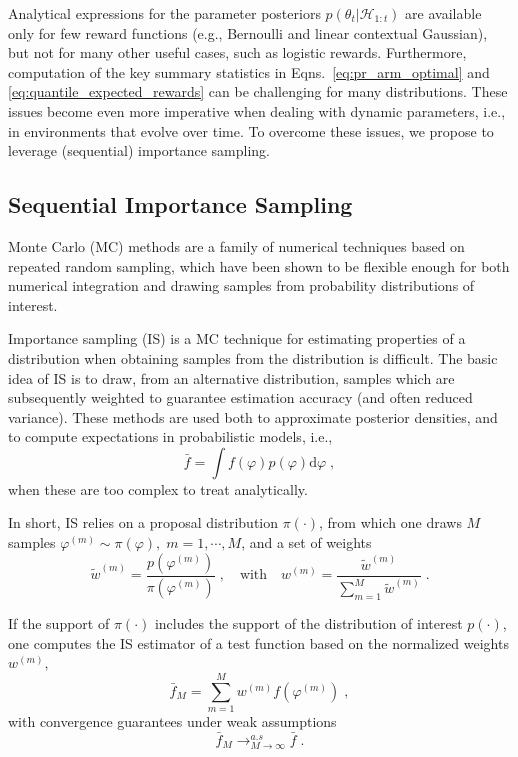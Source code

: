 \documentclass{article}
\newcommand{\HH}{\mathcal{H}}
\newcommand{\ie}{i.e., }
\newcommand{\eg}{e.g., }
\begin{document}
Analytical expressions for the parameter posteriors $p(\theta_t|\HH_{1:t})$ are available only for few reward functions (\eg Bernoulli and linear contextual Gaussian), but not for many other useful cases, such as logistic rewards. Furthermore, computation of the key summary statistics in Eqns.~\eqref{eq:pr_arm_optimal} and \eqref{eq:quantile_expected_rewards} can be challenging for many distributions. These issues become even more imperative when dealing with dynamic parameters, \ie in environments that evolve over time. To overcome these issues, we propose to leverage (sequential) importance sampling.

\subsection{Sequential Importance Sampling}
\label{ssec:problem_statement_sis}

Monte Carlo (MC) methods are a family of numerical techniques based on repeated random sampling, which have been shown to be flexible enough for both numerical integration and drawing samples from probability distributions of interest.

Importance sampling (IS) is a MC technique for estimating properties of a distribution when obtaining samples from the distribution is difficult. The basic idea of IS is to draw, from an alternative distribution, samples which are subsequently weighted to guarantee estimation accuracy (and often reduced variance). These methods are used both to approximate posterior densities, and to compute expectations in probabilistic models, \ie
\begin{equation}
\bar{f}=\int f(\varphi) p(\varphi) \mathrm{d}\varphi \;,
\end{equation}
when these are too complex to treat analytically.

In short, IS relies on a proposal distribution $\pi(\cdot)$, from which one draws $M$ samples $\varphi^{(m)} \sim \pi(\varphi), \; m=1, \cdots , M$, and a set of weights
\begin{equation}
\widetilde{w}^{(m)}=\frac{p(\varphi^{(m)})}{\pi(\varphi^{(m)})} \;, \quad \text{with} \quad w^{(m)}=\frac{\widetilde{w}^{(m)}}{\sum_{m=1}^M\widetilde{w}^{(m)}} \; .
\end{equation}

If the support of $\pi(\cdot)$ includes the support of the distribution of interest $p(\cdot)$, one computes the IS estimator of a test function based on the normalized weights $w^{(m)}$,
\begin{equation}
\bar{f}_M=\sum_{m=1}^M w^{(m)} f\left(\varphi^{(m)}\right) \; ,
\end{equation}
with convergence guarantees under weak assumptions
\begin{equation}
\bar{f}_M \mathop{\longrightarrow}_{M\rightarrow \infty}^{a.s} \bar{f} \; .
\label{eq:is_convergence}
\end{equation}
\end{document}
